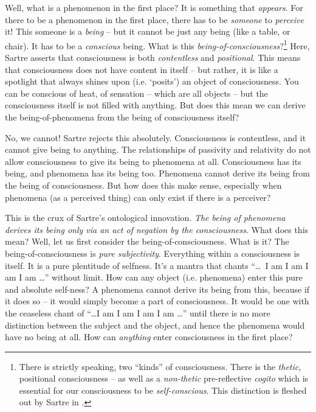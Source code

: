 Well, what is a phenomenon in the first place? It is something that \emph{appears}. For there to be a phenomenon in the first place, there has to be \emph{someone} to \emph{perceive} it! This someone is a \emph{being} -- but it cannot be just any being (like a table, or chair). It has to be a \emph{conscious} being. What is this \emph{being-of-consciousness}?\footnote{There is strictly speaking, two \enquote{kinds} of consciousness. There is the \emph{thetic}, positional consciousness -- as well as a \emph{non-thetic} pre-reflective \emph{cogito} which is essential for our consciousness to be \emph{self-conscious}. This distinction is fleshed out by Sartre in \autocite[11]{sartre}.} Here, Sartre asserts that consciousness is both \emph{contentless} and \emph{positional}. This means that consciousness does not have content in itself -- but rather, it is like a spotlight that always shines upon (i.e. \enquote*{posits}) an object of consciousness. You can be conscious of heat, of sensation -- which are all objects -- but the consciousness itself is not filled with anything. But does this mean we can derive the being-of-phenomena from the being of consciousness itself? 

No, we cannot! Sartre rejects this absolutely. Consciousness is contentless, and it cannot give being to anything. The relationships of passivity and relativity do not allow consciousness to give its being to phenomena at all. Consciousness has its being, and phenomena has its being too. Phenomena cannot derive its being from the being of consciousness. But how does this make sense, especially when phenomena (as a perceived thing) can only exist if there is a perceiver? 

This is the crux of Sartre's ontological innovation. \emph{The being of phenomena derives its being only via an act of negation by the consciousness}. What does this mean? Well, let us first consider the being-of-consciousness. What is it? The being-of-consciousness is \emph{pure subjectivity}. Everything within a consciousness is itself. It is a pure plentitude of selfness. It's a mantra that chants \enquote{\ldots\ I am I am I am I am \ldots} without limit. How can any object (i.e. phenomena) enter this pure and absolute self-ness? A phenomena cannot derive its being from this, because if it does so -- it would simply become a part of consciousness. It would be one with the ceaseless chant of \enquote{\ldots I am I am I am I am \ldots} until there is no more distinction between the subject and the object, and hence the phenomena would have no being at all. How can \emph{anything} enter consciousness in the first place?

